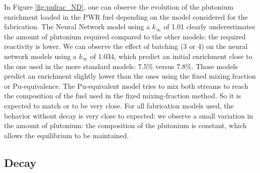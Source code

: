 \documentclass[12pt]{article}
\begin{document}
In Figure \ref{fig:pufrac_ND}, one can observe the evolution of the plutonium
enrichment loaded in the PWR fuel depending on the model considered for the
fabrication.
The Neural Network model using a $k_{\infty}$ of 1.01 clearly underestimates the amount of
plutonium required compared to the other models: the required reactivity is
lower. We can observe the effect of batching (3 or 4) on the
neural network models using a $k_{\infty}$ of 1.034, which predict an initial enrichment
close to the one used in the more standard models: $7.5\%$ versus $7.8\%$. Those
models predict an enrichment slightly lower than the ones using the fixed mixing
fraction or Pu-equivalence.
The Pu-equivalent model tries to mix both streams to reach the composition of the fuel
used in the fixed mixing-fraction method. So it is expected to match or to be very
close.
For all fabrication models used, the behavior without decay is very close to
expected: we observe a small variation in the amount of plutonium: the
composition of the plutonium is constant, which allows the equilibrium to be
maintained. 


\subsection{Decay}
\end{document}
